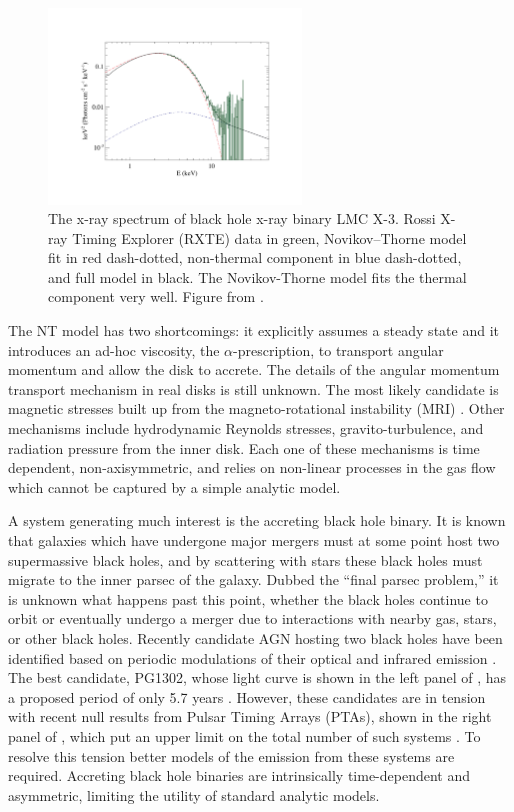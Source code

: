 \begin{figure}
\begin{center}
\includegraphics[width=0.6\textwidth]{figures/lmcx3spec.pdf}
\end{center}
\caption{The x-ray spectrum of black hole x-ray binary LMC X-3.  Rossi X-ray Timing Explorer (RXTE) data in green, Novikov--Thorne model fit in red dash-dotted, non-thermal component in blue dash-dotted, and full model in black.  The Novikov-Thorne model fits the thermal component very well. Figure from \cite{Steiner14}. }
\end{figure}

The NT model has two shortcomings: it explicitly assumes a steady state and it introduces an ad-hoc viscosity, the $\alpha$-prescription, to transport angular momentum and allow the disk to accrete.  The details of the angular momentum transport mechanism in real disks is still unknown.  The most likely candidate is magnetic stresses built up from the magneto-rotational instability (MRI) \citep{Balbus91}.  Other mechanisms include hydrodynamic Reynolds stresses, gravito-turbulence, and radiation pressure from the inner disk.  Each one of these mechanisms is time dependent, non-axisymmetric, and relies on non-linear processes in the gas flow which cannot be captured by a simple analytic model.

A system generating much interest is the accreting black hole binary.  It is known that galaxies which have undergone major mergers must at some point host two supermassive black holes, and by scattering with stars these black holes must migrate to the inner parsec of the galaxy.  Dubbed the ``final parsec problem,'' it is unknown what happens past this point, whether the black holes continue to orbit or eventually undergo a merger due to interactions with nearby gas, stars, or other black holes.  Recently candidate AGN hosting two black holes have been identified based on periodic modulations of their optical and infrared emission \citep{Graham15B, Charisi16}.  The best candidate, PG1302, whose light curve is shown in the left panel of , has a proposed period of only 5.7 years \citep{Graham15A}.  However, these candidates are in tension with recent null results from Pulsar Timing Arrays (PTAs), shown in the right panel of , which put an upper limit on the total number of such systems \citep{NanogravLimits, Sesana17}.   To resolve this tension better models of the emission from these systems are required.  Accreting black hole binaries are intrinsically time-dependent and asymmetric, limiting the utility of standard analytic models.  

